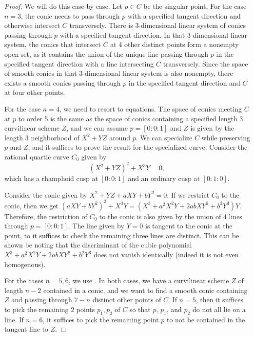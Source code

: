 \documentclass{article}
\theoremstyle{definition}
\begin{document}
\begin{proof}
We will do this case by case. Let $p\in C$ be the singular point, For the case $n=3$, the conic needs to pass through $p$ with a specified tangent direction and otherwise intersect $C$ transversely. There is 3-dimensional linear system of conics passing through $p$ with a specified tangent direction. In that 3-dimensional linear system, the conics that intersect $C$ at 4 other distinct points form a nonempty open set, as it contains the union of the unique line passing through $p$ in the specified tangent direction with a line intersecting $C$ transversely. Since the space of smooth conics in that 3-dimensional linear system is also nonempty, there exists a smooth conics passing through $p$ in the specified tangent direction and $C$ at four other points. 

For the case $n=4$, we need to resort to equations. The space of conics meeting $C$ at $p$ to order 5 is the same as the space of conics containing a specified length 3 curvilinear scheme $Z$, and we can assume $p=[0:0:1]$ and $Z$ is given by the length 3 neighborhood of $X^2+YZ$ around $p$. We can specialize $C$ while preserving $p$ and $Z$, and it suffices to prove the result for the specialized curve. Consider the rational quartic curve $C_0$ given by 
$$(X^2+YZ)^2+X^3Y=0,$$ which has a rhamphoid cusp at $[0:0:1]$ and an ordinary cusp at $[0:1:0]$.

Consider the conic given by $X^2+YZ+aXY+bY^2=0$. If we restrict $C_0$ to the conic, then we get $(aXY+bY^2)^2+X^3Y=(X^3+a^2X^2Y+2abXY^2+b^2Y^3)Y$. Therefore, the restriction of $C_0$ to the conic is also given by the union of 4 lines through $p=[0:0:1]$. The line given by $Y=0$ is tangent to the conic at the point, to it suffices to check the remaining three lines are distinct. This can be shown be noting that the discriminant of the cubic polynomial $X^3+a^2X^2Y+2abXY^2+b^2Y^3$ does not vanish identically (indeed it is not even homogenous).

For the cases $n=5,6$, we use . In both cases, we have a curvilinear scheme $Z$ of length $n-2$ contained in a conic, and we want to find a smooth conic containing $Z$ and passing through $7-n$ distinct other points of $C$. If $n=5$, then it suffices to pick the remaining 2 points $p_1,p_2$ of $C$ so that $p$, $p_1$, and $p_2$ do not all lie on a line. If $n=6$, it suffices to pick the remaining point $p$ to not be contained in the tangent line to $Z$. \end{proof}
\end{document}
